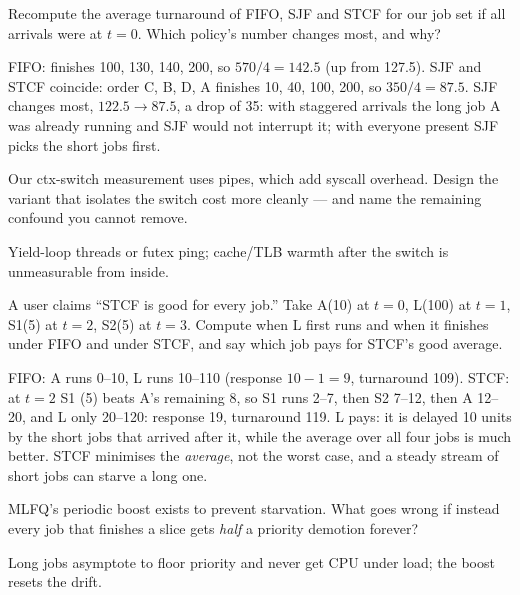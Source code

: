 \begin{exercise}[medium]
Recompute the average turnaround of FIFO, SJF and STCF for our job
set if all arrivals were at $t{=}0$. Which policy's number changes
most, and why?
\end{exercise}
\begin{solution}[hint]
FIFO: finishes 100, 130, 140, 200, so $570/4=142.5$ (up from 127.5).
SJF and STCF coincide: order C, B, D, A finishes 10, 40, 100, 200, so
$350/4=87.5$. SJF changes most, $122.5\to87.5$, a drop of 35: with
staggered arrivals the long job A was already running and SJF would
not interrupt it; with everyone present SJF picks the short jobs
first.
\end{solution}

\begin{exercise}[medium]
Our ctx-switch measurement uses pipes, which add syscall overhead.
Design the variant that isolates the switch cost more cleanly ---
and name the remaining confound you cannot remove.
\end{exercise}
\begin{solution}[hint]
Yield-loop threads or futex ping; cache/TLB warmth after the switch
is unmeasurable from inside.
\end{solution}

\begin{exercise}[medium]
A user claims ``STCF is good for every job.'' Take A(10) at $t{=}0$,
L(100) at $t{=}1$, S1(5) at $t{=}2$, S2(5) at $t{=}3$. Compute when L
first runs and when it finishes under FIFO and under STCF, and say
which job pays for STCF's good average.
\end{exercise}
\begin{solution}[hint]
FIFO: A runs 0--10, L runs 10--110 (response $10-1=9$, turnaround
109). STCF: at $t{=}2$ S1 (5) beats A's remaining 8, so S1 runs 2--7,
then S2 7--12, then A 12--20, and L only 20--120: response 19,
turnaround 119. L pays: it is delayed 10 units by the short jobs
that arrived after it, while the average over all four jobs is much
better. STCF minimises the \emph{average}, not the worst case, and a
steady stream of short jobs can starve a long one.
\end{solution}

\begin{exercise}[medium]
MLFQ's periodic boost exists to prevent starvation. What goes
wrong if instead every job that finishes a slice gets \emph{half} a
priority demotion forever?
\end{exercise}
\begin{solution}[hint]
Long jobs asymptote to floor priority and never get CPU under load;
the boost resets the drift.
\end{solution}

